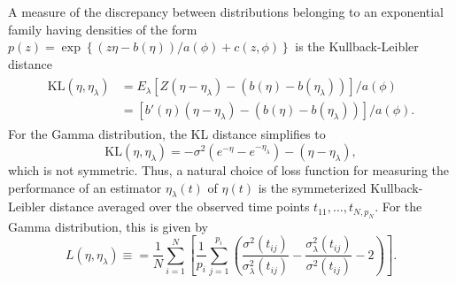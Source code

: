 A measure of the discrepancy between distributions belonging to an exponential family having densities of the form $p\left(z\right) = \exp\left\{\left(z \eta - b\left(\eta\right)\right)/a\left(\phi\right) + c\left(z,\phi\right) \right\}$ is the Kullback-Leibler distance
\begin{align}
\begin{split} \label{eq:kl-distance-definition}
\mbox{KL}\left(\eta, \eta_\lambda\right) &= E_\lambda\left[Z \left(\eta - \eta_\lambda \right) - \left(b\left(\eta\right)- b\left(\eta_\lambda\right) \right)\right]/a\left(\phi\right)\\
&=\left[ b'\left(\eta\right) \left(\eta - \eta_\lambda \right) - \left(b\left(\eta\right)- b\left(\eta_\lambda\right) \right)\right]/a\left(\phi\right).
\end{split}
\end{align}
\noindent
For the Gamma distribution, the KL distance simplifies to
\[
\mbox{KL}\left(\eta, \eta_\lambda\right) = -\sigma^2\left( e^{-\eta} - e^{-{\eta_\lambda}}\right) - \left(\eta-{\eta_\lambda}\right),
\]
\noindent
which is not symmetric. Thus, a natural choice of loss function for measuring the performance of an estimator $\eta_\lambda\left(t\right)$ of $\eta \left(t\right)$ is the symmeterized Kullback-Leibler distance averaged over the observed time points $t_{11}, \dots ,  t_{N,p_N}$. For the Gamma distribution, this is given by 
\begin{equation}\label{eq:gamma-SKL-loss-function}
 L\left( \eta,\eta_\lambda \right) \equiv  = \frac{1}{N}\sum_{i=1}^N \left[\frac{1}{p_i}\sum_{j=1}^{p_i}  \left( \frac{\sigma^2\left(t_{ij}\right)}{\sigma^2_\lambda\left(t_{ij}\right)} - \frac{\sigma^2_\lambda \left(t_{ij}\right)}{\sigma^2\left(t_{ij}\right)} - 2\right)\right].
\end{equation}
\noindent

